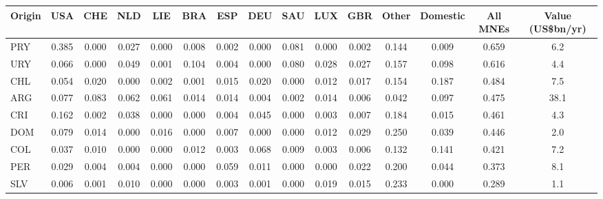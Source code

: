 \begin{tabular}{lcccccccccccccc}
\toprule
Origin & USA & CHE & NLD & LIE & BRA & ESP & DEU & SAU & LUX & GBR & Other & Domestic & All MNEs & Value (US\$bn/yr) \\
\midrule
PRY & 0.385 & 0.000 & 0.027 & 0.000 & 0.008 & 0.002 & 0.000 & 0.081 & 0.000 & 0.002 & 0.144 & 0.009 & 0.659 & 6.2 \\
URY & 0.066 & 0.000 & 0.049 & 0.001 & 0.104 & 0.004 & 0.000 & 0.080 & 0.028 & 0.027 & 0.157 & 0.098 & 0.616 & 4.4 \\
CHL & 0.054 & 0.020 & 0.000 & 0.002 & 0.001 & 0.015 & 0.020 & 0.000 & 0.012 & 0.017 & 0.154 & 0.187 & 0.484 & 7.5 \\
ARG & 0.077 & 0.083 & 0.062 & 0.061 & 0.014 & 0.014 & 0.004 & 0.002 & 0.014 & 0.006 & 0.042 & 0.097 & 0.475 & 38.1 \\
CRI & 0.162 & 0.002 & 0.038 & 0.000 & 0.000 & 0.004 & 0.045 & 0.000 & 0.003 & 0.007 & 0.184 & 0.015 & 0.461 & 4.3 \\
DOM & 0.079 & 0.014 & 0.000 & 0.016 & 0.000 & 0.007 & 0.000 & 0.000 & 0.012 & 0.029 & 0.250 & 0.039 & 0.446 & 2.0 \\
COL & 0.037 & 0.010 & 0.000 & 0.000 & 0.012 & 0.003 & 0.068 & 0.009 & 0.003 & 0.006 & 0.132 & 0.141 & 0.421 & 7.2 \\
PER & 0.029 & 0.004 & 0.004 & 0.000 & 0.000 & 0.059 & 0.011 & 0.000 & 0.000 & 0.022 & 0.200 & 0.044 & 0.373 & 8.1 \\
SLV & 0.006 & 0.001 & 0.010 & 0.000 & 0.000 & 0.003 & 0.001 & 0.000 & 0.019 & 0.015 & 0.233 & 0.000 & 0.289 & 1.1 \\
\bottomrule
\end{tabular}
